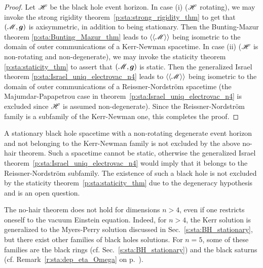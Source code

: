 \begin{proof}
Let $\mathscr{H}$ be the black hole event horizon.
In case (i) ($\mathscr{H}$ rotating), we may invoke the strong rigidity
theorem~\ref{p:sta:strong_rigidity_thm} to get that $(\mathscr{M},\bm{g})$
is axisymmetric, in addition to being stationary. Then the
Bunting-Mazur theorem \ref{p:sta:Bunting_Mazur_thm} leads to
$\langle\langle \mathscr{M}\rangle\rangle$ being isometric
to the domain of outer communications of a Kerr-Newman spacetime.
In case (ii) ($\mathscr{H}$ is non-rotating and
non-degenerate), we
may invoke the staticity theorem \ref{p:sta:staticity_thm}
to assert that $(\mathscr{M},\bm{g})$ is static. Then the generalized Israel
theorem \ref{p:sta:Israel_uniq_electrovac_n4} leads to $\langle\langle \mathscr{M}\rangle\rangle$
being isometric to the domain of outer communications of a Reissner-Nordström
spacetime (the Majumdar-Papapetrou case in theorem~\ref{p:sta:Israel_uniq_electrovac_n4}
is excluded since $\mathscr{H}$ is assumed non-degenerate). Since the Reissner-Nordström
family is a subfamily of the Kerr-Newman one, this completes the proof.
\end{proof}

\begin{remark}
A stationary black hole spacetime with a non-rotating degenerate
event horizon and not belonging to the Kerr-Newman family
is not excluded by the above no-hair theorem. Such a spacetime cannot be static,
otherwise the generalized Israel theorem~\ref{p:sta:Israel_uniq_electrovac_n4}
would imply that it belongs to the Reissner-Nordström subfamily.
The existence of such a black hole is not excluded by the staticity
theorem~\ref{p:sta:staticity_thm} due to the degeneracy hypothesis
and is an open question.
\end{remark}

\begin{remark}
The no-hair theorem does not hold for dimensions $n > 4$, even if one restricts
oneself to the vacuum Einstein equation. Indeed, for $n> 4$, the
Kerr solution is generalized to the Myers-Perry solution
discussed in Sec.~\ref{s:sta:BH_stationary}, but there exist other families
of black holes solutions. For $n=5$, some of these families are the black
rings (cf. Sec.~\ref{s:sta:BH_stationary}) and the
black saturns (cf. Remark~\ref{r:sta:dep_eta_Omega} on
p.~\pageref{r:sta:dep_eta_Omega}).
\end{remark}

